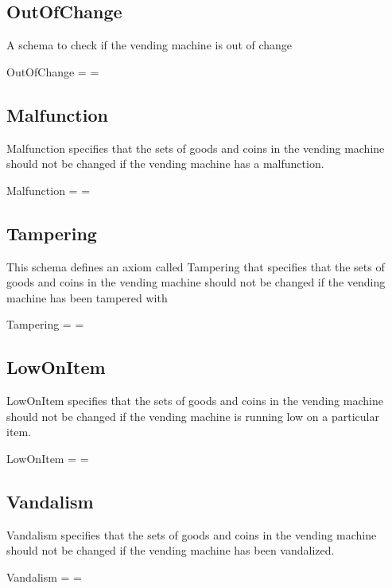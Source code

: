 \documentclass{article}
\begin{document}
\subsection{OutOfChange}
A schema to check if the vending machine is out of change
\begin{schema}{OutOfChange}
 = 
 = 
\end{schema}


\subsection{Malfunction}
Malfunction specifies that the sets of goods and coins in the vending machine should not be changed if the vending machine has a malfunction.
\begin{schema}{Malfunction}
 = 
 = 
\end{schema}


\subsection{Tampering}
This schema defines an axiom called Tampering that specifies that the sets of goods and coins in the vending machine should not be changed if the vending machine has been tampered with
\begin{schema}{Tampering}
 = 
 = 
\end{schema}


\subsection{LowOnItem}
LowOnItem specifies that the sets of goods and coins in the vending machine should not be changed if the vending machine is running low on a particular item.
\begin{schema}{LowOnItem}
 = 
 = 
\end{schema}


\subsection{Vandalism}
Vandalism specifies that the sets of goods and coins in the vending machine should not be changed if the vending machine has been vandalized.
\begin{schema}{Vandalism}
 = 
 = 
\end{schema}
\end{document}
